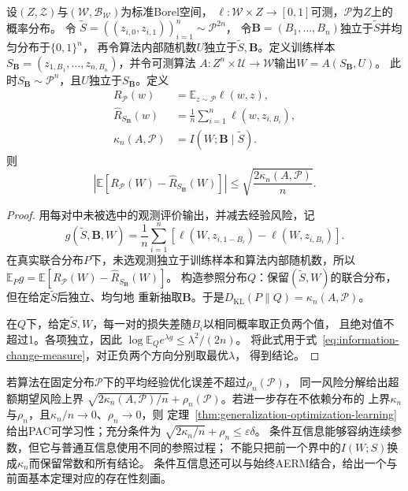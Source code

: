 \begin{theorem}[条件互信息与期望风险]
\label{thm:conditional-information-risk}
设$(Z,\mathcal Z)$与$(\mathcal W,\mathcal B_{\mathcal W})$为标准Borel空间，
$\ell:\mathcal W\times Z\to[0,1]$可测，$\mathcal P$为$Z$上的概率分布。
令
$\tilde S=((z_{i,0},z_{i,1}))_{i=1}^n\sim\mathcal P^{2n}$，
令$\bm B=(B_1,\ldots,B_n)$独立于$\tilde S$并均匀分布于$\{0,1\}^n$，
再令算法内部随机数$U$独立于$\tilde S,\bm B$。定义训练样本
$S_{\bm B}=(z_{1,B_1},\ldots,z_{n,B_n})$，并令可测算法
$A:Z^n\times\mathcal U\to\mathcal W$输出$W=A(S_{\bm B},U)$。
此时$S_{\bm B}\sim\mathcal P^n$，且$U$独立于$S_{\bm B}$。定义
\[
\begin{aligned}
 R_{\mathcal P}(w)
 &=\mathbb E_{z\sim\mathcal P}\ell(w,z),\\
 \hat R_{S_{\bm B}}(w)
 &=\frac1n\sum_{i=1}^n\ell(w,z_{i,B_i}),\\
 \kappa_n(A,\mathcal P)
 &=I(W;\bm B\mid\tilde S).
\end{aligned}
\]
则
\[
 \left|\mathbb E[R_{\mathcal P}(W)-\hat R_{S_{\bm B}}(W)]\right|
 \leq\sqrt{\frac{2\kappa_n(A,\mathcal P)}n}.
\]
\end{theorem}
\begin{proof}
用每对中未被选中的观测评价输出，并减去经验风险，记
\[
 g(\tilde S,\bm B,W)=\frac1n\sum_{i=1}^n
 [\ell(W,z_{i,1-B_i})-\ell(W,z_{i,B_i})].
\]
在真实联合分布$P$下，未选观测独立于训练样本和算法内部随机数，所以
$\mathbb E_Pg=\mathbb E[R_{\mathcal P}(W)-\hat R_{S_{\bm B}}(W)]$。
构造参照分布$Q$：保留$(\tilde S,W)$的联合分布，但在给定$\tilde S$后独立、均匀地
重新抽取$\bm B$。于是$D_{\mathrm{KL}}(P\|Q)=\kappa_n(A,\mathcal P)$。

在$Q$下，给定$\tilde S,W$，每一对的损失差随$B_i$以相同概率取正负两个值，
且绝对值不超过1。各项独立，因此
$\log\mathbb E_Q e^{\lambda g}\leq\lambda^2/(2n)$。
将此式用于式~\eqref{eq:information-change-measure}，对正负两个方向分别取最优$\lambda$，
得到结论。
\end{proof}

若算法在固定分布$\mathcal P$下的平均经验优化误差不超过$\rho_n(\mathcal P)$，
同一风险分解给出超额期望风险上界
$\sqrt{2\kappa_n(A,\mathcal P)/n}+\rho_n(\mathcal P)$。若进一步存在不依赖分布的
上界$\kappa_n$与$\rho_n$，且$\kappa_n/n\to0$、$\rho_n\to0$，则
定理~\ref{thm:generalization-optimization-learning}给出PAC可学习性；充分条件为
$\sqrt{2\kappa_n/n}+\rho_n\leq\varepsilon\delta$。
条件互信息能够容纳连续参数，但它与普通互信息使用不同的参照过程；
不能只把前一个界中的$I(W;S)$换成$\kappa_n$而保留常数和所有结论。
条件互信息还可以与始终AERM结合，给出一个与前面基本定理对应的存在性刻画。

